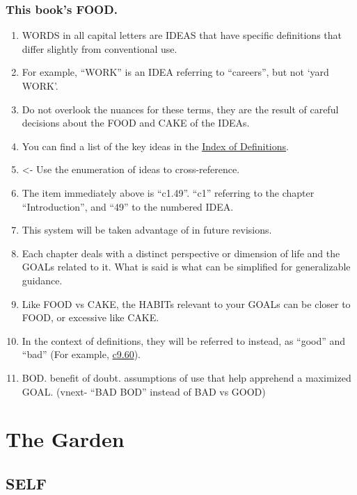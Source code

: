 \documentclass[
]{book}
\begin{document}
\hypertarget{this-books-food.}{%
\section{This book's FOOD.}\label{this-books-food.}}

\begin{enumerate}
\def\labelenumi{\arabic{enumi}.}
\setcounter{enumi}{44}
\item
  WORDS in all capital letters are IDEAS that have specific definitions that differ
  slightly from conventional use.
\item
  For example, ``WORK'' is an IDEA referring to ``careers'', but not `yard WORK'.
\item
  Do not overlook the nuances for these terms, they are the result of careful decisions about the FOOD and CAKE of the IDEAs.
\item
  You can find a list of the key ideas in the \protect\hyperlink{index-of-definitions}{Index of Definitions}.
\item
  \textless- Use the enumeration of ideas to cross-reference.
\item
  The item immediately above is ``c1.49''. ``c1'' referring to the chapter ``Introduction'', and ``49'' to the numbered IDEA.
\item
  This system will be taken advantage of in future revisions.
\item
  Each chapter deals with a distinct perspective or dimension of life and the GOALs related to it. What is said is what can be simplified for generalizable guidance.
\item
  Like FOOD vs CAKE, the HABITs relevant to your GOALs can be closer to FOOD, or excessive like CAKE.
\item
  In the context of definitions, they will be referred to instead, as ``good'' and ``bad'' (For example, \protect\hyperlink{pris-differ}{c9.60}).
\item
  BOD. benefit of doubt. assumptions of use that help apprehend a maximized GOAL.
  (vnext- ``BAD BOD'' instead of BAD vs GOOD)
\end{enumerate}

\hypertarget{part-the-garden}{%
\part{The Garden}\label{part-the-garden}}

\hypertarget{self}{%
\chapter{SELF}\label{self}}
\end{document}
